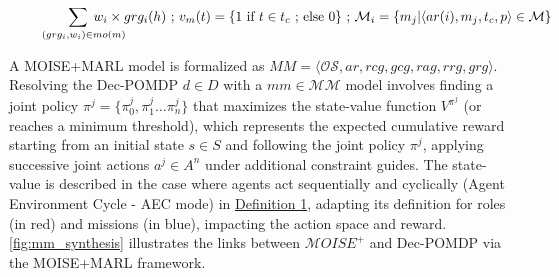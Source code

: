 \documentclass[pdflatex,sn-mathphys-num]{sn-jnl}%
\theoremstyle{thmstyleone}%
\theoremstyle{thmstyletwo}%
\theoremstyle{thmstylethree}%
\begin{document}
\begin{figure}[h]
\begin{scriptsize}
{        }
        \vspace{-0.95cm}
        \textcolor{blue}{
            \begin{gather*}
                \hspace{-0.5cm} \sum_{\hspace{0.3cm}(grg_i,w_i) \in mo(m)}{\hspace{-0.9cm} w_i \times grg_i(h)}
                \text{ ; } v_m(t) = \{ 1 \text{ if } t \in t_c \text{ ; else } 0 \} \text{ ; } \mathcal{M}_i = \{m_j | \langle ar(i),m_j,t_c,p \rangle \in \mathcal{M}\}
            \end{gather*}
        }
        \vspace{-0.6cm}
    \end{scriptsize}
    
\end{figure}

A MOISE+MARL model is formalized as $MM = \langle \mathcal{OS}, ar, rcg, gcg, rag, rrg, grg\rangle$.
Resolving the Dec-POMDP $d \in D$ with a $mm \in \mathcal{MM}$ model involves finding a joint policy $\pi^{j} = \{\pi^j_0,\pi^j_1\dots\pi^j_n\}$ that maximizes the state-value function $V^{\pi^{j}}$ (or reaches a minimum threshold), which represents the expected cumulative reward starting from an initial state $s \in S$ and following the joint policy $\pi^{j}$, applying successive joint actions $a^{j} \in A^n$ under additional constraint guides. The state-value is described in the case where agents act sequentially and cyclically (Agent Environment Cycle - AEC mode) in \hyperref[eq:single_value_function]{Definition 1}, adapting its definition for roles (in red) and missions (in blue), impacting the action space and reward. \autoref{fig:mm_synthesis} illustrates the links between $\mathcal{M}OISE^+$ and Dec-POMDP via the MOISE+MARL framework.
\end{document}
